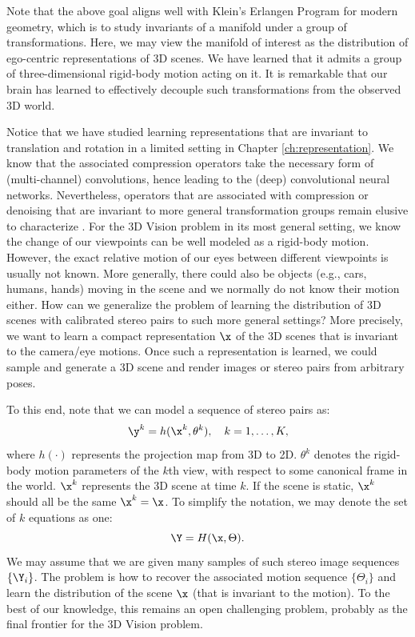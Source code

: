 \documentclass[../../book-main.tex]{subfiles}
\begin{document}
\begin{remark}Note that the above goal aligns well with Klein's Erlangen Program for modern geometry, which is to study invariants of a manifold under a group of transformations. Here, we may view the manifold of interest as the distribution of ego-centric representations of 3D scenes. We have learned that it admits a group of three-dimensional rigid-body motion acting on it. It is remarkable that our brain has learned to effectively decouple such transformations from the observed 3D world.
\end{remark}


Notice that we have studied learning representations that are invariant to translation and rotation in a limited setting in Chapter \ref{ch:representation}. We know that the associated compression operators take the necessary form of (multi-channel) convolutions, hence leading to the (deep) convolutional neural networks. Nevertheless, operators that are associated with compression or denoising that are invariant to more general transformation groups remain elusive to characterize \cite{cohen2016group}.  
For the 3D Vision problem in its most general setting, we know the change of our viewpoints can be well modeled as a rigid-body motion. However, the exact relative motion of our eyes between different viewpoints is usually not known. More generally, there could also be objects (e.g., cars, humans, hands) moving in the scene and we normally do not know their motion either. How can we generalize the problem of learning the distribution of 3D scenes with calibrated stereo pairs to such more general settings? More precisely, we want to learn a compact representation $\x$ of the 3D scenes that is invariant to the camera/eye motions. Once such a representation is learned, we could sample and generate a 3D scene and render images or stereo pairs from arbitrary poses. 


To this end, note that we can model a sequence of stereo pairs as:
\begin{equation}
    \y^k = h(\x^k, \theta^k), \quad k=1, \ldots, K,
\end{equation}
where $h(\cdot)$ represents the projection map from 3D to 2D. $\theta^k$ denotes the rigid-body motion parameters of the $k$th view, with respect to some canonical frame in the world. $\x^k$ represents the 3D scene at time $k$. If the scene is static, $\x^k$ should all be the same $\x^k = \x$. To simplify the notation, we may denote the set of $k$ equations as one:
\begin{equation}
    \Y = H(\x,\Theta). 
\end{equation}
We may assume that we are given many samples of such stereo image sequences $\{\Y_i\}$. The problem is how to recover the associated motion sequence $\{\Theta_i\}$ and learn the distribution of the scene $\x$ (that is invariant to the motion). To the best of our knowledge, this remains an open challenging problem, probably as the final frontier for the 3D Vision problem. 
\end{document}
